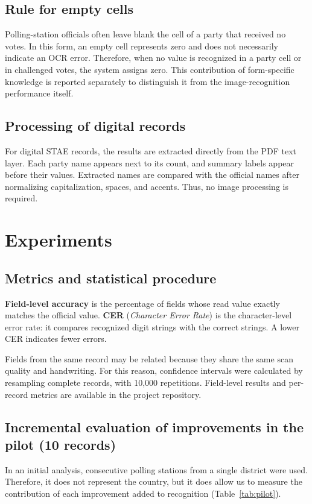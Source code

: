 \documentclass[conference]{IEEEtran}
\begin{document}
\subsection{Rule for empty cells}
Polling-station officials often leave blank the cell of a party that received no
votes. In this form, an empty cell represents zero and does not necessarily
indicate an OCR error. Therefore, when no value is recognized in a party cell or
in challenged votes, the system assigns zero. This contribution of form-specific
knowledge is reported separately to distinguish it from the image-recognition
performance itself.

\subsection{Processing of digital records}
\label{sec:stae}
For digital STAE records, the results are extracted directly from the PDF text
layer. Each party name appears next to its count, and summary labels appear
before their values. Extracted names are compared with the official names after
normalizing capitalization, spaces, and accents. Thus, no image processing is
required.

\section{Experiments}
\subsection{Metrics and statistical procedure}
\textbf{Field-level accuracy} is the percentage of fields whose read value
exactly matches the official value. \textbf{CER} (\emph{Character Error Rate})
is the character-level error rate: it compares recognized digit strings with the
correct strings. A lower CER indicates fewer errors.

Fields from the same record may be related because they share the same scan
quality and handwriting. For this reason, confidence intervals were calculated
by resampling complete records, with 10,000 repetitions. Field-level results and
per-record metrics are available in the project repository.

\subsection{Incremental evaluation of improvements in the pilot (10 records)}
In an initial analysis, consecutive polling stations from a single district were
used. Therefore, it does not represent the country, but it does allow us to
measure the contribution of each improvement added to recognition
(Table~\ref{tab:pilot}).
\end{document}
